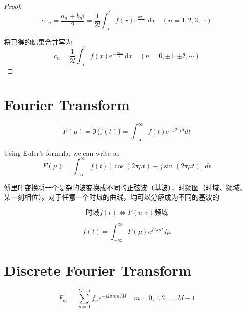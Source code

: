 \begin{proof}
\begin{equation} c_{-n}=\frac{a_{n}+b_{n} \mathrm{i}}{2}=\frac{1}{2 l} \int_{-l}^{l} f(x) \mathrm{e}^{\frac{n \pi x}{l} i} \mathrm{~d} x \quad(n=1,2,3, \cdots) \end{equation}

将已得的结果合并写为
\begin{equation}
c_{n}=\frac{1}{2 l} \int_{-l}^{l} f(x) \mathrm{e}^{-\frac{n \pi x}{l}} \mathrm{~d} x \quad(n=0, \pm 1, \pm 2, \cdots)
\end{equation}

\end{proof}

\section{Fourier Transform}

\begin{definition}
    \begin{equation}F(\mu) = \Im\{f(t)\}=\int_{-\infty}^{\infty} f(t) e^{-j 2 \pi \mu t} d t \end{equation}

    Using Euler's formula, we can write as
\begin{equation}
F(\mu)=\int_{-\infty}^{\infty} f(t)[\cos (2 \pi \mu t)-j \sin (2 \pi \mu t)] d t
\end{equation}
\end{definition}

傅里叶变换将一个复杂的波变换成不同的正弦波（基波），时频图（时域、频域、某一刻相位）。对于任意一个时域的曲线，均可以分解成为不同的基波的

\begin{equation}时域f(t) \Leftrightarrow F(u,v) 频域\end{equation}

\begin{definition}
    \begin{equation} f(t)=\int_{-\infty}^{\infty} F(\mu) e^{j 2 \pi \mu t} d \mu \end{equation}
\end{definition}


\section{Discrete Fourier Transform}

\begin{definition}
    \begin{equation} F_{m}=\sum_{n=0}^{M-1} f_{n} e^{-j 2 \pi m n / M} \quad m=0,1,2, \ldots, M-1 \end{equation}
\end{definition}

